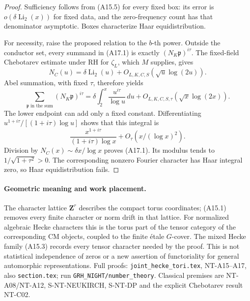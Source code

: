 \begin{proof}
Sufficiency follows from (A15.5) for every fixed box:
its error is \(o(\delta\operatorname{Li}_2(x))\) for fixed
data, and the zero-frequency count has that denominator
asymptotic. Boxes characterize Haar equidistribution.

For necessity, raise the proposed relation to the \(b\)-th
power. Outside the conductor set, every summand in (A17.1)
is exactly \((N_K\mathfrak p)^{i\tau}\).
The fixed-field Chebotarev estimate under RH for \(\zeta_L\),
which \(M\) supplies, gives
\[
 N_C(u)=\delta\operatorname{Li}_2(u)
                       +O_{L,K,C,S}(\sqrt u\log(2u)).
 \]
Abel summation, with fixed \(\tau\), therefore yields
\[
 \sum_{\mathfrak p\text{ in the sum}}
                  (N_K\mathfrak p)^{i\tau}
    =\delta\int_2^x\frac{u^{i\tau}}{\log u}\,du
                +O_{L,K,C,S,\tau}(\sqrt x\log(2x)).
 \]
The lower endpoint can add only a fixed constant.
Differentiating
\(u^{1+i\tau}/[(1+i\tau)\log u]\) shows that this integral is
\[
       \frac{x^{1+i\tau}}{(1+i\tau)\log x}
                         +O_\tau(x/(\log x)^2).
 \]
Division by \(N_C(x)\sim\delta x/\log x\) proves (A17.1).
Its modulus tends to \(1/\sqrt{1+\tau^2}>0\).
The corresponding nonzero Fourier character has Haar
integral zero, so Haar equidistribution fails.
\end{proof}

\paragraph{Geometric meaning and work placement.}
The character lattice \(\mathbf Z^r\) describes the
compact torus coordinates; (A15.1) removes every
finite character or norm drift in that lattice.
For normalized algebraic Hecke characters this is the
torus part of the tensor category of the corresponding
CM objects, coupled to the finite \'{e}tale \(G\)-cover.
The mixed Hecke family (A15.3) records every tensor
character needed by the proof. This is not statistical
independence of zeros or a new assertion of functoriality
for general automorphic representations.
Full proofs: \texttt{joint\_hecke\_tori.tex}, NT-A15--A17,
also \texttt{section.tex}; run
\texttt{GRH\_NIGHT/number\_theory}.
Classical premises are NT-A08/NT-A12, S-NT-NEUKIRCH,
S-NT-DP and the explicit Chebotarev result NT-C02.
